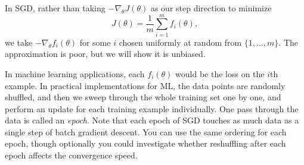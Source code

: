 \documentclass{article}
\begin{document}
In SGD, rather than taking $-\nabla_{\theta} J(\theta)$
as our step direction to minimize 
\[
J(\theta)=\frac{1}{m}\sum_{i=1}^{m}f_{i}(\theta), 
\]
we take $-\nabla_\theta f_{i}(\theta)$ for some $i$
chosen uniformly at random from $\{1,\ldots,m\}$. The approximation
is poor, but we will show it is unbiased. 

In machine learning applications, each $f_{i}(\theta)$
would be the loss on the $i$th example. In
practical implementations for ML, the data points are randomly shuffled, and then we sweep through the whole training set one by
one, and perform an update for each training example individually.
One pass through the data is called an \emph{epoch}. Note that each
epoch of SGD touches as much data as a single step of batch gradient
descent. You can use the same ordering for each epoch, though optionally
you could investigate whether reshuffling after each epoch affects
the convergence speed. 
\end{document}

